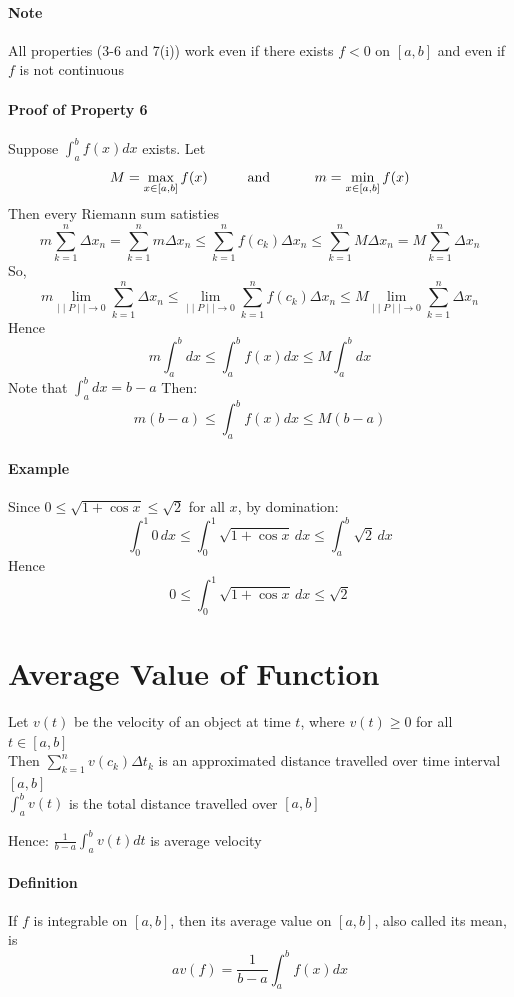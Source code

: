 \documentclass[12pt]{article}
\newcommand\tab[1][1cm]{\hspace*{#1}}
\begin{document}
\paragraph{Note} All properties (3-6 and 7(i)) work even if there exists  $f < 0$ on $[a, b]$ 
and even if $f$ is not continuous

\paragraph{Proof of Property 6}
Suppose $\int_{a}^{b} f(x) dx$ exists. Let 
\[
  M = \max_{x \in [a, b]} f(x) \textrm{\tab and \tab} m = \min_{x \in [a, b]} f(x)
\]
Then every Riemann sum satisties
\[
    m \sum_{k = 1}^n \Delta x_n = \sum_{k = 1}^n m \Delta x_n \leq \sum_{k = 1}^n f(c_k) \Delta x_n \leq \sum_{k = 1}^n M \Delta x_n = M \sum_{k = 1}^n \Delta x_n
\]
So,
\[
    m \lim_{ \mid \mid P \mid \mid \to 0} \sum_{k = 1}^n \Delta x_n \leq \lim_{ \mid \mid P \mid \mid \to 0} \sum_{k = 1}^n f(c_k) \Delta x_n \leq M \lim_{ \mid \mid P \mid \mid \to 0} \sum_{k = 1}^n \Delta x_n
\]
Hence
\[
    m \int_{a}^{b} dx \leq \int_{a}^{b} f(x) dx \leq M \int_{a}^{b} dx  
\]
Note that  $\int_{a}^{b} dx = b - a$
Then:
\[
    m(b - a) \leq \int_{a}^{b} f(x) dx \leq M(b - a)
\]

\paragraph{Example} Since $0 \leq \sqrt{1 + \cos x} \leq \sqrt{2}$ for all $x$, by domination:
\[
    \int_{0}^{1} 0 \, dx \leq \int_{0}^{1} \sqrt{1 + \cos x} \, dx \leq  \int_{a}^{b} \sqrt{2} \, dx 
\]
Hence
\[
    0 \leq  \int_{0}^{1} \sqrt{1 +  \cos x} \, dx \leq \sqrt{2}
\]

\section{Average Value of Function}
Let $v(t)$ be the velocity of an object at time $t$, where $v(t) \geq 0$ for all $t \in [a, b]$ \\
Then $\sum_{k = 1}^n v(c_k) \Delta t_k$ is an approximated distance travelled over time interval $[a,b]$ \\
$\int_{a}^{b} v(t)$ is the total distance travelled over $[a, b]$

Hence: $\frac{1}{b - a} \int_a^b v(t) dt$ is average velocity

\paragraph{Definition}
If $f$ is integrable on $[a, b]$, then its average value on $[a, b]$, also called its mean, is 
\[
    av(f) = \frac{1}{b - a} \int_a^b f(x) dx 
\]
\end{document}
